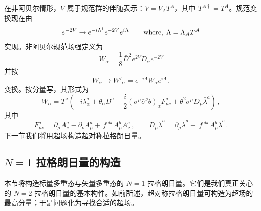 在非阿贝尔情形，$V$ 属于规范群的伴随表示：$V=V_AT^A$，其中 $T^{A\dagger}=T^A$。规范变换现在由
$$
e^{-2V} \rightarrow e^{-i \Lambda^\dagger} e^{-2V} e^{i \Lambda}
\qquad {\rm where}, \; \Lambda = \Lambda_{A}T^{A}
$$
实现。非阿贝尔规范场强定义为
$$
W_{\alpha} = \frac{1}{8} \bar{D}^{2} e^{2V} D_{\alpha} e^{-2V}
$$
并按
$$
W_\alpha\rightarrow W'_\alpha= e^{-i\Lambda}W_\alpha e^{i\Lambda}\,.
$$
变换。按分量写，其形式为
\begin{equation}
W_\alpha =T^a \left (-i \lambda^{a}_{\alpha} + \theta_{\alpha}
D^{a} - \frac{i}{2}(\sigma^\mu \bar{\sigma}^\nu \theta )_{\alpha}
F^{a}_{\mu\nu}+\theta^2 \sigma^\mu D_\mu\bar{\lambda}^a \right)\,, 
\label{W-nonabelian}
\end{equation}
其中
$$
F^a_{\mu\nu}=\partial_\mu A^a_\nu -\partial_\nu A^a_\mu + 
\, f^{abc} A^b_\mu A^c_\nu\,,\qquad
D_\mu\bar{\lambda}^a=\partial_\mu\bar{\lambda}^a +
\,f^{abc} A_\mu^b \bar{\lambda}^c \,.
$$
下一节我们将用超场构造超对称拉格朗日量。


\subsection{$N=1$ 拉格朗日量的构造}

本节将构造标量多重态与矢量多重态的 $N=1$ 拉格朗日量。它们是我们真正关心的 $N=2$ 拉格朗日量的基本构件。如前所述，超对称拉格朗日量可构造为超场的最高分量；于是问题化为寻找合适的超场。

